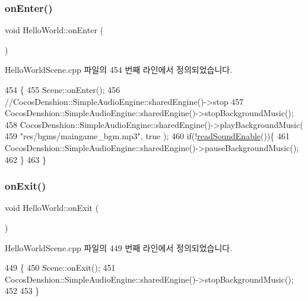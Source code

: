 \subsubsection{\texorpdfstring{on\+Enter()}{onEnter()}}
{\footnotesize\ttfamily void Hello\+World\+::on\+Enter (\begin{DoxyParamCaption}{ }\end{DoxyParamCaption})\hspace{0.3cm}{\ttfamily [virtual]}}



Hello\+World\+Scene.\+cpp 파일의 454 번째 라인에서 정의되었습니다.


\begin{DoxyCode}
454                         \{
455     Scene::onEnter();
456     \textcolor{comment}{//CocosDenshion::SimpleAudioEngine::sharedEngine()->stop}
457     CocosDenshion::SimpleAudioEngine::sharedEngine()->stopBackgroundMusic();
458     CocosDenshion::SimpleAudioEngine::sharedEngine()->playBackgroundMusic(
459                                                                           \textcolor{stringliteral}{"res/bgms/maingame\_bgm.mp3"}, \textcolor{keyword}{true}
      );
460     \textcolor{keywordflow}{if}(!\hyperlink{class_hello_world_a0f8c9d1b95e03b397e680b9dafb8f3d9}{readSoundEnable}())\{
461         CocosDenshion::SimpleAudioEngine::sharedEngine()->pauseBackgroundMusic();
462     \}
463 \}
\end{DoxyCode}
\mbox{\label{class_hello_world_a348da8e1c3061248666676878e692572}} 
\subsubsection{\texorpdfstring{on\+Exit()}{onExit()}}
{\footnotesize\ttfamily void Hello\+World\+::on\+Exit (\begin{DoxyParamCaption}{ }\end{DoxyParamCaption})\hspace{0.3cm}{\ttfamily [virtual]}}



Hello\+World\+Scene.\+cpp 파일의 449 번째 라인에서 정의되었습니다.


\begin{DoxyCode}
449                        \{
450     Scene::onExit();
451     CocosDenshion::SimpleAudioEngine::sharedEngine()->stopBackgroundMusic();
452 
453 \}
\end{DoxyCode}
\mbox{\label{class_hello_world_af2d5a509259a5d0fce7770a38df371d3}} 
